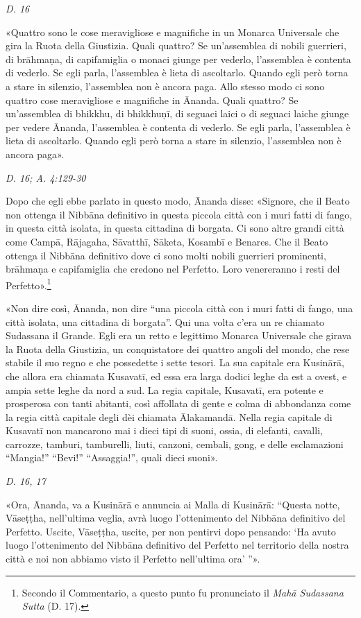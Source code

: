 \emph{D. 16}


«Quattro sono le cose meravigliose e magnifiche in un Monarca Universale
che gira la Ruota della Giustizia. Quali quattro? Se un’assemblea di
nobili guerrieri, di brāhmaṇa, di capifamiglia o monaci giunge per
vederlo, l’assemblea è contenta di vederlo. Se egli parla, l’assemblea è
lieta di ascoltarlo. Quando egli però torna a stare in silenzio,
l’assemblea non è ancora paga. Allo stesso modo ci sono quattro cose
meravigliose e magnifiche in Ānanda. Quali quattro? Se un’assemblea di
bhikkhu, di bhikkhuṇī, di seguaci laici o di seguaci laiche giunge per
vedere Ānanda, l’assemblea è contenta di vederlo. Se egli parla,
l’assemblea è lieta di ascoltarlo. Quando egli però torna a stare in
silenzio, l’assemblea non è ancora paga».


\emph{D. 16; A. 4:129-30}


Dopo che egli ebbe parlato in questo modo, Ānanda disse: «Signore, che
il Beato non ottenga il Nibbāna definitivo in questa piccola città con i
muri fatti di fango, in questa città isolata, in questa cittadina di
borgata. Ci sono altre grandi città come Campā, Rājagaha, Sāvatthī,
Sāketa, Kosambī e Benares. Che il Beato ottenga il Nibbāna definitivo
dove ci sono molti nobili guerrieri prominenti, brāhmaṇa e capifamiglia
che credono nel Perfetto. Loro venereranno i resti del
Perfetto».\footnote{Secondo il Commentario, a questo punto fu pronunciato il \emph{Mahā Sudassana Sutta} (D. 17).}


«Non dire così, Ānanda, non dire “una piccola città con i muri fatti di
fango, una città isolata, una cittadina di borgata”. Qui una volta c’era
un re chiamato Sudassana il Grande. Egli era un retto e legittimo
Monarca Universale che girava la Ruota della Giustizia, un conquistatore
dei quattro angoli del mondo, che rese stabile il suo regno e che
possedette i sette tesori. La sua capitale era Kusinārā, che allora era
chiamata Kusavatī, ed essa era larga dodici leghe da est a ovest, e
ampia sette leghe da nord a sud. La regia capitale, Kusavatī, era
potente e prosperosa con tanti abitanti, così affollata di gente e colma
di abbondanza come la regia città capitale degli dèi chiamata
Ālakamandā. Nella regia capitale di Kusavatī non mancarono mai i dieci
tipi di suoni, ossia, di elefanti, cavalli, carrozze, tamburi,
tamburelli, liuti, canzoni, cembali, gong, e delle esclamazioni
“Mangia!” “Bevi!” “Assaggia!”, quali dieci suoni».


\emph{D. 16, 17}


«Ora, Ānanda, va a Kusinārā e annuncia ai Malla di Kusinārā: “Questa
notte, Vāseṭṭha, nell’ultima veglia, avrà luogo l’ottenimento del
Nibbāna definitivo del Perfetto. Uscite, Vāseṭṭha, uscite, per non
pentirvi dopo pensando: ‘Ha avuto luogo l’ottenimento del Nibbāna
definitivo del Perfetto nel territorio della nostra città e noi non
abbiamo visto il Perfetto nell’ultima ora’ ”».


